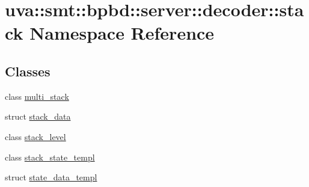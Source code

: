 \hypertarget{namespaceuva_1_1smt_1_1bpbd_1_1server_1_1decoder_1_1stack}{}\section{uva\+:\+:smt\+:\+:bpbd\+:\+:server\+:\+:decoder\+:\+:stack Namespace Reference}
\label{namespaceuva_1_1smt_1_1bpbd_1_1server_1_1decoder_1_1stack}
\subsection*{Classes}
\begin{DoxyCompactItemize}
\item 
class \hyperlink{classuva_1_1smt_1_1bpbd_1_1server_1_1decoder_1_1stack_1_1multi__stack}{multi\+\_\+stack}
\item 
struct \hyperlink{structuva_1_1smt_1_1bpbd_1_1server_1_1decoder_1_1stack_1_1stack__data}{stack\+\_\+data}
\item 
class \hyperlink{classuva_1_1smt_1_1bpbd_1_1server_1_1decoder_1_1stack_1_1stack__level}{stack\+\_\+level}
\item 
class \hyperlink{classuva_1_1smt_1_1bpbd_1_1server_1_1decoder_1_1stack_1_1stack__state__templ}{stack\+\_\+state\+\_\+templ}
\item 
struct \hyperlink{structuva_1_1smt_1_1bpbd_1_1server_1_1decoder_1_1stack_1_1state__data__templ}{state\+\_\+data\+\_\+templ}
\end{DoxyCompactItemize}
